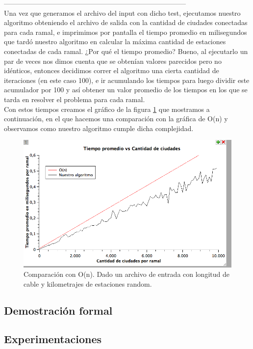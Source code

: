 --------------------------------------------------------------------------------\\

Una vez que generamos el archivo del input con dicho test, ejecutamos nuestro algoritmo obteniendo el archivo de salida con la cantidad de ciudades conectadas para cada ramal, e imprimimos por pantalla el tiempo promedio en milisegundos que tardó nuestro algoritmo en calcular la máxima cantidad de estaciones conectadas de cada ramal. ¿Por qué el tiempo promedio? Bueno, al ejecutarlo un par de veces nos dimos cuenta que se obtenían valores parecidos pero no idénticos, entonces decidimos correr el algoritmo una cierta cantidad de iteraciones (en este caso 100), e ir acumulando los tiempos para luego dividir este acumulador por 100 y así obtener un valor promedio de los tiempos en los que se tarda en resolver el problema para cada ramal. \\

Con estos tiempos creamos el gráfico de la figura \ref{ej1-tiempo-vs-cant-ciudades-random} que mostramos a continuación, en el que hacemos una comparación con la gráfica de O(n) y observamos como nuestro algoritmo cumple dicha complejidad.


\begin{figure}[H]
\begin{center}

  \includegraphics[width=\linewidth]{../graficos/ej1/1erEjTiempoPromedioVsO(n).png}
  \caption{{\small Comparación con O(n). Dado un archivo de entrada con longitud de cable y kilometrajes de estaciones random.}} \label{ej1-tiempo-vs-cant-ciudades-random}
\endminipage

\end{center}
\end{figure}
\subsection{Demostración formal}
\subsection{Experimentaciones}